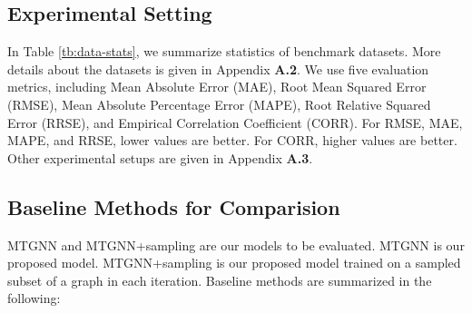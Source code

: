 \documentclass[sigconf]{acmart}
\begin{document}
\subsection{Experimental Setting}
In Table \ref{tb:data-stats}, we summarize statistics of benchmark datasets.
More details about the datasets is given in Appendix \textbf{A.2}. 
We use five evaluation metrics, including Mean Absolute Error (MAE), Root Mean Squared Error (RMSE), Mean Absolute Percentage Error (MAPE), Root Relative Squared Error (RRSE), and Empirical Correlation Coefficient (CORR). For RMSE, MAE, MAPE, and RRSE, lower values are better. For CORR, higher values are better. 
Other experimental setups are given in Appendix \textbf{A.3}.
\begin{table}
	\begin{center}
		\caption{\small Dataset statistics.}
		\label{tb:data-stats}
	\end{center}
\end{table}

\subsection{Baseline Methods for Comparision}
MTGNN and MTGNN+sampling are our models to be evaluated. MTGNN is our proposed model.   MTGNN+sampling is our proposed model trained on a sampled subset of a graph in each iteration. 
Baseline methods are summarized in the following:
\end{document}

